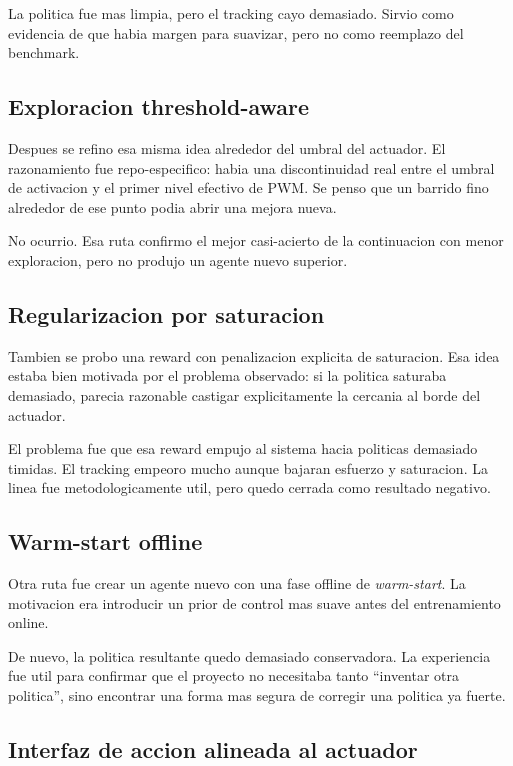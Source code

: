 \documentclass[11pt,a4paper]{article}
\begin{document}
La politica fue mas limpia, pero el tracking cayo demasiado. Sirvio como evidencia de que habia margen para suavizar, pero no como reemplazo del benchmark.

\subsection{Exploracion threshold-aware}

Despues se refino esa misma idea alrededor del umbral del actuador. El razonamiento fue repo-especifico: habia una discontinuidad real entre el umbral de activacion y el primer nivel efectivo de PWM. Se penso que un barrido fino alrededor de ese punto podia abrir una mejora nueva.

No ocurrio. Esa ruta confirmo el mejor casi-acierto de la continuacion con menor exploracion, pero no produjo un agente nuevo superior.

\subsection{Regularizacion por saturacion}

Tambien se probo una reward con penalizacion explicita de saturacion. Esa idea estaba bien motivada por el problema observado: si la politica saturaba demasiado, parecia razonable castigar explicitamente la cercania al borde del actuador.

El problema fue que esa reward empujo al sistema hacia politicas demasiado timidas. El tracking empeoro mucho aunque bajaran esfuerzo y saturacion. La linea fue metodologicamente util, pero quedo cerrada como resultado negativo.

\subsection{Warm-start offline}

Otra ruta fue crear un agente nuevo con una fase offline de \textit{warm-start}. La motivacion era introducir un prior de control mas suave antes del entrenamiento online.

De nuevo, la politica resultante quedo demasiado conservadora. La experiencia fue util para confirmar que el proyecto no necesitaba tanto ``inventar otra politica'', sino encontrar una forma mas segura de corregir una politica ya fuerte.

\subsection{Interfaz de accion alineada al actuador}
\end{document}
